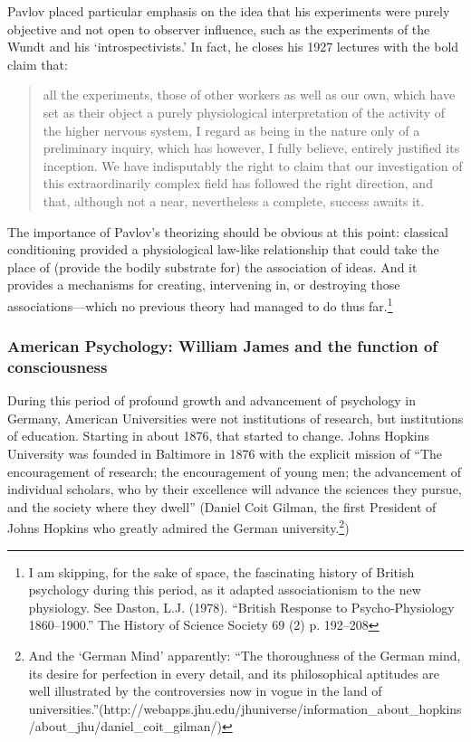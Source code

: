 Pavlov placed particular emphasis on the idea that his experiments were purely objective and not open to observer influence, such as the experiments of the Wundt and his `introspectivists.' In fact, he closes his 1927 lectures with the bold claim that:

\begin{quote}

all the experiments, those of other workers as well as our own, which have set as their object a purely physiological interpretation of the activity of the higher nervous system, I regard as being in the nature only of a preliminary inquiry, which has however, I fully believe, entirely justified its inception. We have indisputably the right to claim that our investigation of this extraordinarily complex field has followed the right direction, and that, although not a near, nevertheless a complete, success awaits it.
\end{quote}

The importance of Pavlov's theorizing should be obvious at this point: classical conditioning provided a physiological law-like relationship that could take the place of (provide the bodily substrate for) the association of ideas. And it provides a mechanisms for creating, intervening in, or destroying those associations---which no previous theory had managed to do thus far.\footnote{I am skipping, for the sake of space, the fascinating history of British psychology during this period, as it adapted associationism to the new physiology. See Daston, L.J. (1978). ``British Response to Psycho-Physiology 1860--1900.'' The History of Science Society 69 (2) p. 192--208}

\subsubsection{American Psychology: William James and the function of consciousness}
\label{americanpsychology:williamjamesandthefunctionofconsciousness}

During this period of profound growth and advancement of psychology in Germany, American Universities were not institutions of research, but institutions of education. Starting in about 1876, that started to change. Johns Hopkins University was founded in Baltimore in 1876 with the explicit mission of ``The encouragement of research; the encouragement of young men; the advancement of individual scholars, who by their excellence will advance the sciences they pursue, and the society where they dwell'' (Daniel Coit Gilman, the first President of Johns Hopkins who greatly admired the German university.\footnote{And the `German Mind' apparently: ``The thoroughness of the German mind, its desire for perfection in every detail, and its philosophical aptitudes are well illustrated by the controversies now in vogue in the land of universities.''(http:\slash \slash webapps.jhu.edu\slash jhuniverse\slash information\_about\_hopkins\slash about\_jhu\slash daniel\_coit\_gilman\slash )})

